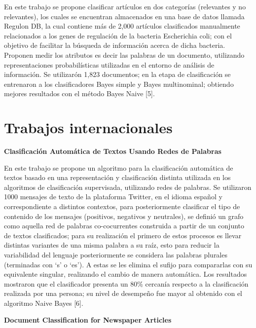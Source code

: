 En este trabajo se propone clasificar artículos en dos categorías (relevantes y no relevantes), los cuales se encuentran almacenados en una base de datos llamada Regulon DB, la cual contiene más de 2,000 artículos clasificados manualmente relacionados a los genes de regulación de la bacteria Escherichia coli; con el objetivo de facilitar la búsqueda de información acerca de dicha bacteria.
Proponen medir los atributos es decir las palabras de un documento, utilizando representaciones probabilísticas utilizadas en el entorno de análisis de información.
Se utilizarón 1,823 documentos; en la etapa de clasificación se entrenaron a  los clasificadores Bayes simple y Bayes multinominal; obtiendo mejores resultados con el método Bayes Naive [5].


\section{Trabajos internacionales}


\begin{large}
	 \textbf{Clasificación Automática de Textos Usando Redes de Palabras}\\
\end{large}

En este trabajo se propone un algoritmo para la clasificación automática de textos basado en una representación y clasificación distinta utilizada en los algoritmos de clasificación supervisada, utilizando redes de palabras.
Se utilizaron 1000 mensajes de texto de la plataforma Twitter, en el idioma español y correspondiente a distintos contextos, para posteriormente clasificar el tipo de contenido de los mensajes (positivos, negativos y neutrales), se definió un grafo como aquella red de palabras co-cocurrentes construida a partir de un conjunto de textos clasificados; para su realización el primero de estos procesos es llevar distintas variantes de una misma palabra a su raíz, esto para reducir la variabilidad del lenguaje posteriormente se considera las palabras plurales (terminadas con ‘s’ o ‘es’). A estas se les elimina el sufijo para compararlas con su equivalente singular, realizando el cambio de manera automática.
Los resultados mostraron que el clasificador presenta un 80\% cercanía respecto a la clasificación realizada por una persona; su nivel de desempeño fue mayor al obtenido con el algoritmo Naive Bayes [6].\\


\begin{large}
	 \textbf{Document Classification for Newspaper Articles}\\
\end{large}

